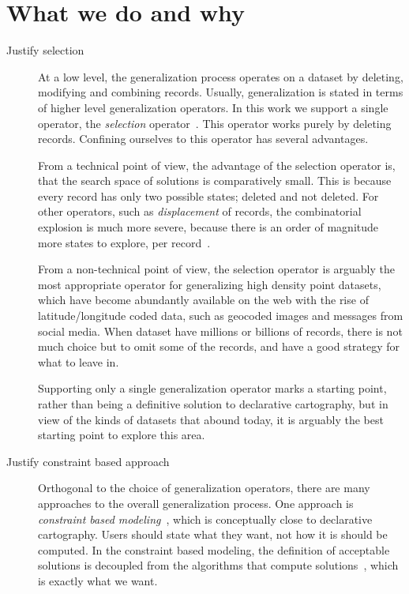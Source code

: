 \documentclass[11pt, oneside]{article}   	%
\begin{document}
\section{What we do and why}

\begin{description}

\item[Justify selection] At a low level, the generalization process operates on a dataset by deleting, modifying and combining records. Usually, generalization is stated in terms of higher level generalization operators. In this work we support a single operator, the \emph{selection} operator~\cite{weibel1999generalising}. This operator works purely by deleting records. Confining ourselves to this operator has several advantages. 

From a technical point of view, the advantage of the selection operator is, that the search space of solutions is comparatively small. This is because every record has only two possible states; deleted and not deleted. For other operators, such as \emph{displacement} of records, the combinatorial explosion is much more severe, because there is an order of magnitude more states to explore, per record~\cite{harrie2007modelling}.

From a non-technical point of view, the selection operator is arguably the most appropriate operator for generalizing high density point datasets, which have become abundantly available on the web with the rise of latitude/longitude coded data, such as geocoded images and messages from social media. When dataset have millions or billions of records, there is not much choice but to omit some of the records, and have a good strategy for what to leave in.

Supporting only a single generalization operator marks a starting point, rather than being a definitive solution to declarative cartography, but in view of the kinds of datasets that abound today, it is arguably the best starting point to explore this area.

\item[Justify constraint based approach] Orthogonal to the choice of generalization operators, there are many approaches to the overall generalization process. One approach is \emph{constraint based modeling}~\cite{harrie1999constraint}, which is conceptually close to declarative cartography. Users should state what they want, not how it is should be computed. In the constraint based modeling, the definition of acceptable solutions is decoupled from the algorithms that compute solutions~\cite{beard1991constraints}, which is exactly what we want. 


\end{description}
\end{document}
